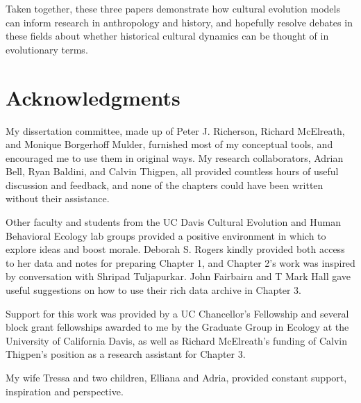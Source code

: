 \documentclass[letterpaper, 12pt, oneside]{book}
\begin{document}
Taken together, these three papers demonstrate how cultural evolution models can inform research in anthropology and history, and hopefully resolve debates in these fields about whether historical cultural dynamics can be thought of in evolutionary terms.  


    
    \newpage
    
       

    \chapter*{\vspace{-1.5in}Acknowledgments}

    
My dissertation committee, made up of Peter J. Richerson, Richard McElreath, and Monique Borgerhoff Mulder, furnished most of my conceptual tools, and encouraged me to use them in original ways.  My research collaborators, Adrian Bell, Ryan Baldini, and Calvin Thigpen, all provided countless hours of useful discussion and feedback, and none of the chapters could have been written without their assistance. 

Other faculty and students from the UC Davis Cultural Evolution and Human Behavioral Ecology lab groups provided a positive environment in which to explore ideas and boost morale.  Deborah S. Rogers kindly provided both access to her data and notes for preparing Chapter 1, and Chapter 2's work was inspired by conversation with Shripad Tuljapurkar.  John Fairbairn and T Mark Hall gave useful suggestions on how to use their rich data archive in Chapter 3.

Support for this work was provided by a UC Chancellor's Fellowship and several block grant fellowships awarded to me by the Graduate Group in Ecology at the University of California Davis, as well as Richard McElreath's funding of Calvin Thigpen's position as a research assistant for Chapter 3.

My wife Tressa and two children, Elliana and Adria, provided constant support, inspiration and perspective.

    
    \newpage
    
\end{document}
